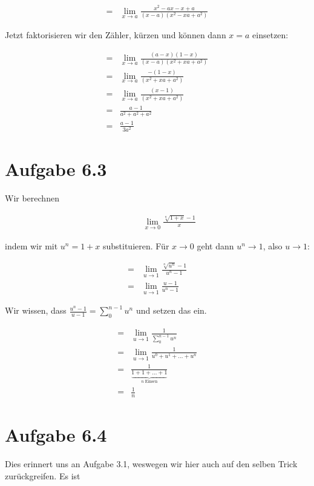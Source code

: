 \documentclass[a4paper,german,12pt,smallheadings]{scrartcl}
\begin{document}
\begin{align*}
  = &\lim_{x \to a} \frac{x^2 - ax - x + a}{(x-a)(x^2 - xa + a^2)}
\end{align*}

Jetzt faktorisieren wir den Zähler, kürzen und können dann $x = a$ einsetzen:

\begin{align*}
  = &\lim_{x \to a} \frac{(a-x)(1-x)}{(x-a)(x^2 + xa + a^2)} \\
  = &\lim_{x \to a} \frac{-(1-x)}{(x^2 + xa + a^2)} \\
  = &\lim_{x \to a} \frac{(x-1)}{(x^2 + xa + a^2)} \\
  = &\frac{a-1}{a^2 + a^2 + a^2} \\
  = &\frac{a-1}{3a^2}
\end{align*}

\section*{Aufgabe 6.3}

Wir berechnen

\begin{align*}
  \qquad&\lim_{x \to 0} \frac{\sqrt[n]{1+x} - 1}{x}
\end{align*}

indem wir mit $u^n = 1+x$ substituieren. Für $x \to 0$ geht dann $u^n \to 1$, also $u \to 1$:

\begin{align*}
  = &\lim_{u \to 1} \frac{\sqrt[n]{u^n} - 1}{u^n -1} \\
  = &\lim_{u \to 1} \frac{u - 1}{u^n -1}
\end{align*}

Wir wissen, dass $\frac{u^n-1}{u-1} = \sum_0^{n-1} u^n$ und setzen das ein.

\begin{align*}
  = &\lim_{u \to 1} \frac{1}{\sum_0^{n-1} u^n} \\
  = &\lim_{u \to 1} \frac{1}{u^0 + u^1 + \dots + u^n} \\
  = &\frac{1}{\underbrace{1 + 1 + \dots + 1}_{n\;\text{Einsen}}} \\
  = &\frac{1}{n}
\end{align*}

\section*{Aufgabe 6.4}

Dies erinnert uns an Aufgabe 3.1, weswegen wir hier auch auf den selben Trick
zurückgreifen. Es ist
\end{document}
